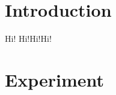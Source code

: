 \documentclass[10pt,twocolumn]{article}
\begin{document}
\section{Introduction}
Hi! Hi!Hi!Hi!
\section{Experiment}
\end{document}
